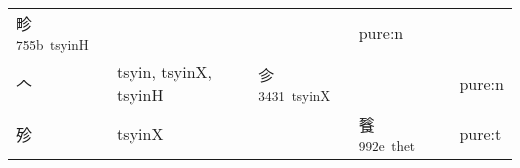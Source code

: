 \documentclass[14pt,a4paper]{scrartcl}
\begin{document}
\begin{longtable}[c]{@{}llllll@{}}
\begin{minipage}[t]{0.14\columnwidth}
畛\textsuperscript{755b~tsyinH}
\strut\end{minipage} &
\begin{minipage}[t]{0.14\columnwidth}\raggedright\strut
\strut\end{minipage} &
\begin{minipage}[t]{0.14\columnwidth}\raggedright\strut
\strut\end{minipage} &
\begin{minipage}[t]{0.14\columnwidth}\raggedright\strut
pure:n
\strut\end{minipage}\tabularnewline
\begin{minipage}[t]{0.14\columnwidth}\raggedright\strut
𠆢
\strut\end{minipage} &
\begin{minipage}[t]{0.14\columnwidth}\raggedright\strut
tsyin, tsyinX, tsyinH
\strut\end{minipage} &
\begin{minipage}[t]{0.14\columnwidth}\raggedright\strut
㐱\textsuperscript{3431~tsyinX}
\strut\end{minipage} &
\begin{minipage}[t]{0.14\columnwidth}\raggedright\strut
\strut\end{minipage} &
\begin{minipage}[t]{0.14\columnwidth}\raggedright\strut
\strut\end{minipage} &
\begin{minipage}[t]{0.14\columnwidth}\raggedright\strut
pure:n
\strut\end{minipage}\tabularnewline
\begin{minipage}[t]{0.14\columnwidth}\raggedright\strut
殄
\strut\end{minipage} &
\begin{minipage}[t]{0.14\columnwidth}\raggedright\strut
tsyinX
\strut\end{minipage} &
\begin{minipage}[t]{0.14\columnwidth}\raggedright\strut
\strut\end{minipage} &
\begin{minipage}[t]{0.14\columnwidth}\raggedright\strut
餮\textsuperscript{992e~thet}
\strut\end{minipage} &
\begin{minipage}[t]{0.14\columnwidth}\raggedright\strut
\strut\end{minipage} &
\begin{minipage}[t]{0.14\columnwidth}\raggedright\strut
pure:t
\strut\end{minipage}\tabularnewline
\bottomrule
\end{longtable}
\end{document}
